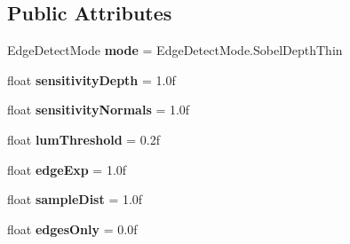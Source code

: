 \subsection*{Public Attributes}
\begin{DoxyCompactItemize}
\item 
Edge\+Detect\+Mode {\bfseries mode} = Edge\+Detect\+Mode.\+Sobel\+Depth\+Thin\hypertarget{class_unity_standard_assets_1_1_image_effects_1_1_edge_detection_aba444f32988b872cf709946d75eefb6a}{}\label{class_unity_standard_assets_1_1_image_effects_1_1_edge_detection_aba444f32988b872cf709946d75eefb6a}

\item 
float {\bfseries sensitivity\+Depth} = 1.\+0f\hypertarget{class_unity_standard_assets_1_1_image_effects_1_1_edge_detection_a0284f65303c62643e48d4df5971ca1d9}{}\label{class_unity_standard_assets_1_1_image_effects_1_1_edge_detection_a0284f65303c62643e48d4df5971ca1d9}

\item 
float {\bfseries sensitivity\+Normals} = 1.\+0f\hypertarget{class_unity_standard_assets_1_1_image_effects_1_1_edge_detection_abcada6169dbaee43b868d7ca30c200eb}{}\label{class_unity_standard_assets_1_1_image_effects_1_1_edge_detection_abcada6169dbaee43b868d7ca30c200eb}

\item 
float {\bfseries lum\+Threshold} = 0.\+2f\hypertarget{class_unity_standard_assets_1_1_image_effects_1_1_edge_detection_a64a02522a743c2ea329076ceed0199b9}{}\label{class_unity_standard_assets_1_1_image_effects_1_1_edge_detection_a64a02522a743c2ea329076ceed0199b9}

\item 
float {\bfseries edge\+Exp} = 1.\+0f\hypertarget{class_unity_standard_assets_1_1_image_effects_1_1_edge_detection_a077fdb63102170684248bb7e4156e0bd}{}\label{class_unity_standard_assets_1_1_image_effects_1_1_edge_detection_a077fdb63102170684248bb7e4156e0bd}

\item 
float {\bfseries sample\+Dist} = 1.\+0f\hypertarget{class_unity_standard_assets_1_1_image_effects_1_1_edge_detection_a57b1200f59628f5eb4ae3edda6e4d433}{}\label{class_unity_standard_assets_1_1_image_effects_1_1_edge_detection_a57b1200f59628f5eb4ae3edda6e4d433}

\item 
float {\bfseries edges\+Only} = 0.\+0f\hypertarget{class_unity_standard_assets_1_1_image_effects_1_1_edge_detection_a4690f3058d1202ede950b77f76e7a1de}{}\label{class_unity_standard_assets_1_1_image_effects_1_1_edge_detection_a4690f3058d1202ede950b77f76e7a1de}


\end{DoxyCompactItemize}
